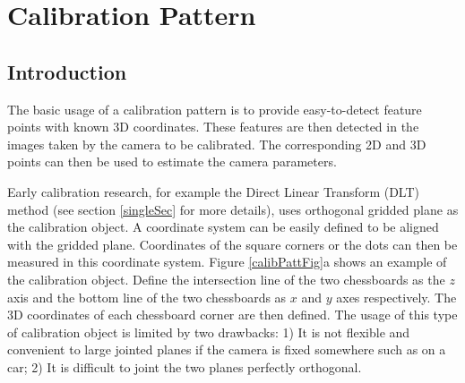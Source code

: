 \documentclass{report}
\begin{document}
\chapter{Calibration Pattern}
\label{patternSec}
\section{Introduction}
The basic usage of a calibration pattern is to provide easy-to-detect feature points with known 3D coordinates. These features are then detected in the images taken by the camera to be calibrated. The corresponding 2D and 3D points can then be used to estimate the camera parameters. 

Early calibration research, for example the Direct Linear Transform (DLT) method \cite{abdelaziz1971} (see section \ref{singleSec} for more details), uses orthogonal gridded plane as the calibration object. A coordinate system can be easily defined to be aligned with the gridded plane. Coordinates of the square corners or the dots can then be measured in this coordinate system. Figure \ref{calibPattFig}a shows an example of the calibration object. Define the intersection line of the two chessboards as the $z$ axis and the bottom line of the two chessboards as $x$ and $y$ axes respectively. The 3D coordinates of each chessboard corner are then defined. The usage of this type of calibration object is limited by two drawbacks: 1) It is not flexible and convenient to large jointed planes if the camera is fixed somewhere such as on a car; 2) It is difficult to joint the two planes perfectly orthogonal. 
\end{document}
